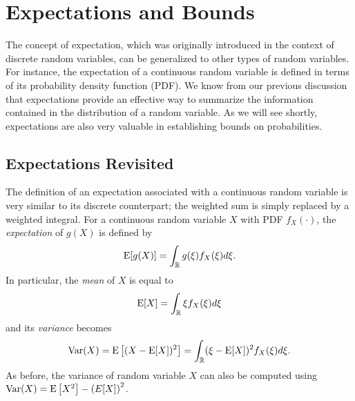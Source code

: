 \chapter{Expectations and Bounds}

The concept of expectation, which was originally introduced in the context of discrete random variables, can be generalized to other types of random variables.
For instance, the expectation of a continuous random variable is defined in terms of its probability density function (PDF).
We know from our previous discussion that expectations provide an effective way to summarize the information contained in the distribution of a random variable.
As we will see shortly, expectations are also very valuable in establishing bounds on probabilities.


\section{Expectations Revisited}

The definition of an expectation associated with a continuous random variable is very similar to its discrete counterpart;
the weighted sum is simply replaced by a weighted integral.
For a continuous random variable $X$ with PDF $f_X(\cdot)$, the \emph{expectation} of $g(X)$ is defined by 
\begin{equation*}
\mathrm{E} [g(X)]
= \int_{\mathbb{R}} g(\xi) f_X (\xi) d\xi .
\end{equation*}
In particular, the \emph{mean} of $X$ is equal to 
\begin{equation*}
\mathrm{E} [X]
= \int_{\mathbb{R}} \xi f_X (\xi) d\xi
\end{equation*}
and its \emph{variance} becomes 
\begin{equation*}
\mathrm{Var} (X) = \mathrm{E} \left[ (X - \mathrm{E}[X])^2 \right]
= \int_{\mathbb{R}} (\xi - \mathrm{E}[X])^2 f_X (\xi) d\xi .
\end{equation*}
As before, the variance of random variable $X$ can also be computed using $\mathrm{Var}(X) = \mathrm{E} \left[ X^2 \right] - \left( E[X] \right)^2$.

